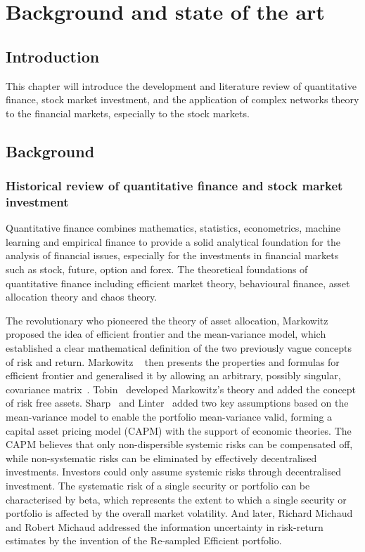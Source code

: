 \chapter[Background]{Background and state of the art}
\label{cpt:back}

\section{Introduction}
This chapter will introduce the development and literature review of quantitative finance, stock market investment, and the application of complex networks theory to the financial markets, especially to the stock markets.

\section{Background}
\subsection{Historical review of quantitative finance and stock market investment}
Quantitative finance combines mathematics, statistics, econometrics, machine learning and empirical finance to provide a solid analytical foundation for the analysis of financial issues, especially for the investments in financial markets such as stock, future, option and forex. The theoretical foundations of quantitative finance including efficient market theory, behavioural finance, asset allocation theory and chaos theory.

The revolutionary who pioneered the theory of asset allocation, Markowitz \cite{portfolio} proposed the idea of efficient frontier and the mean-variance model, which established a clear mathematical definition of the two previously vague concepts of risk and return. Markowitz ~\cite{markowitz1956optimization} then presents the properties and formulas for efficient frontier and generalised it by allowing an arbitrary, possibly singular, covariance matrix~\cite{markowitz1959portfolio}. Tobin~\cite{tobin1958liquidity} developed Markowitz's theory and added the concept of risk free assets. Sharp~\cite{equilibrium} and Linter~\cite{diversification} added two key assumptions based on the mean-variance model to enable the portfolio mean-variance valid, forming a capital asset pricing model (CAPM) with the support of economic theories. The CAPM believes that only non-dispersible systemic risks can be compensated off, while non-systematic risks can be eliminated by effectively decentralised investments. Investors could only assume systemic risks through decentralised investment. The systematic risk of a single security or portfolio can be characterised by beta, which represents the extent to which a single security or portfolio is affected by the overall market volatility. And later, Richard Michaud and Robert Michaud \cite{michaud1998asset} addressed the information uncertainty in risk-return estimates by the invention of the Re-sampled Efficient portfolio.

